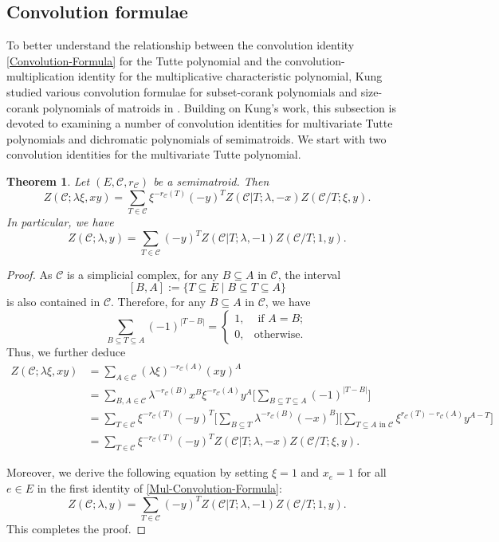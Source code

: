 \documentclass[12pt]{article}%
\renewcommand*{\bm}[1]{#1}%
\numberwithin{equation}{section}
\newtheorem{theorem}{Theorem}[section]
\begin{document}
\subsection{Convolution formulae}\label{Sec-2-2}
To better understand the relationship between the convolution identity \eqref{Convolution-Formula} for the Tutte polynomial and the convolution-multiplication identity \cite[Theorem 4]{Kung2004} for the multiplicative characteristic polynomial, Kung studied various convolution formulae for subset-corank polynomials and size-corank polynomials of matroids in \cite{Kung2010}. Building on Kung's work, this subsection is devoted to examining a number of convolution identities for multivariate Tutte polynomials and dichromatic polynomials of semimatroids. We start with two convolution identities for the multivariate Tutte polynomial.
\begin{theorem}\label{Mul-Convolution-Formula}
Let $(E,\mathcal{C},r_{\mathcal{C}})$ be a semimatroid. Then
\[
Z(\mathcal{C};\lambda\xi,\bm x\bm y)=\sum_{T\in\mathcal{C}}\xi^{-r_\mathcal{C}(T)}(-\bm y)^TZ(\mathcal{C}|T;\lambda,-\bm x)Z(\mathcal{C}/T;\xi,\bm y).
\]
In particular, we have
\[
Z(\mathcal{C};\lambda,\bm y)=\sum_{T\in\mathcal{C}}(-\bm y)^TZ(\mathcal{C}|T;\lambda,-1)Z(\mathcal{C}/T;1,\bm y).
\]
\end{theorem}
\begin{proof}
As $\mathcal{C}$ is a simplicial complex, for any $B\subseteq A$ in $\mathcal{C}$, the interval 
\[
[B,A]:=\{T\subseteq E\mid B\subseteq T\subseteq A\}
\]
is also contained in $\mathcal{C}$. Therefore, for any $B\subseteq A$ in $\mathcal{C}$, we have
\[
\sum_{B\subseteq T\subseteq A}(-1)^{|T-B|}=
\begin{cases}
1,&\text{ if } A=B;\\
0,&\text{otherwise}.
\end{cases}
\] 
Thus, we further deduce 
\begin{align*}
Z(\mathcal{C};\lambda\xi,\bm x\bm y)&=\sum_{A\in\mathcal{C}}(\lambda\xi)^{-r_\mathcal{C}(A)}(\bm x\bm y)^A\\
&=\sum_{B,A\in\mathcal{C}}\lambda^{-r_\mathcal{C}(B)}\bm x^B\xi^{-r_\mathcal{C}(A)}\bm y^A\Big[\sum_{B\subseteq T\subseteq A}(-1)^{|T-B|}\Big]\\
&=\sum_{T\in\mathcal{C}}\xi^{-r_\mathcal{C}(T)}(-\bm y)^T\Big[\sum_{B\subseteq T}\lambda^{-r_\mathcal{C}(B)}(-\bm x)^B\Big]\Big[\sum_{T\subseteq A\text{ in }\mathcal{C}}\xi^{r_\mathcal{C}(T)-r_\mathcal{C}(A)}\bm y^{A-T}\Big]\\
&=\sum_{T\in\mathcal{C}}\xi^{-r_\mathcal{C}(T)}(-\bm y)^TZ(\mathcal{C}|T;\lambda,-\bm x)Z(\mathcal{C}/T;\xi,\bm y).
\end{align*}

Moreover, we derive the following equation by setting $\xi=1$ and $x_e=1$ for all $e\in E$ in the first identity of \autoref{Mul-Convolution-Formula}:
\[
Z(\mathcal{C};\lambda,\bm y)=\sum_{T\in\mathcal{C}}(-\bm y)^TZ(\mathcal{C}|T;\lambda,-1)Z(\mathcal{C}/T;1,\bm y).
\]
This completes the proof.
\end{proof}
\end{document}

